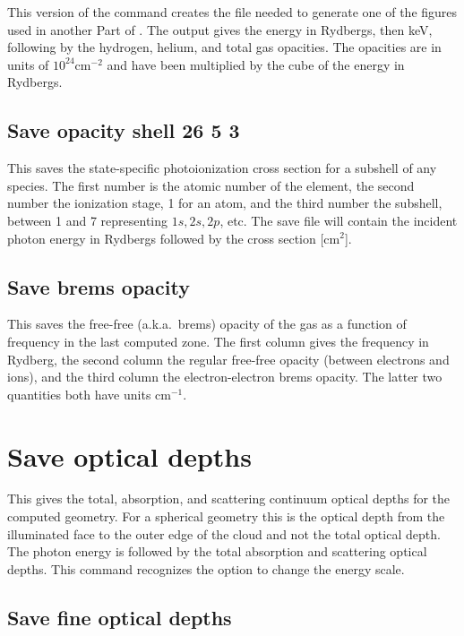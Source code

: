 This version of the command creates the file needed to generate one of
the figures used in another Part of \Hazy.
The output gives the energy in Rydbergs,
then keV, following by the hydrogen, helium, and total gas opacities.
The
opacities are in units of $10^{24} \mathrm{cm}^{-2}$ and have been multiplied by the cube
of the energy in Rydbergs.

\subsection{Save opacity shell 26 5 3}

This saves the state-specific photoionization cross section for a
subshell of any species.  The first number is the atomic number of the
element, the second number the ionization stage, 1 for an atom, and the
third number the subshell, between 1 and 7 representing $1s, 2s, 2p$, etc.
The save file will contain the incident photon energy in Rydbergs
followed by the cross section [cm$^2$].

\subsection{Save brems opacity}

This saves the free-free (a.k.a.\ brems) opacity of the gas as a function of
frequency in the last computed zone. The first column gives the frequency in
Rydberg, the second column the regular free-free opacity (between electrons
and ions), and the third column the electron-electron brems opacity. The
latter two quantities both have units cm$^{-1}$.

\section{Save optical depths}

This gives the total, absorption, and scattering continuum optical depths
for the computed geometry.  For a spherical geometry this is the optical
depth from the illuminated face to the outer edge of the cloud and not the
total optical depth.  The photon energy is followed by the total absorption
and scattering optical depths.
This command recognizes the  option
to change the energy scale.

\subsection{Save fine optical depths}


